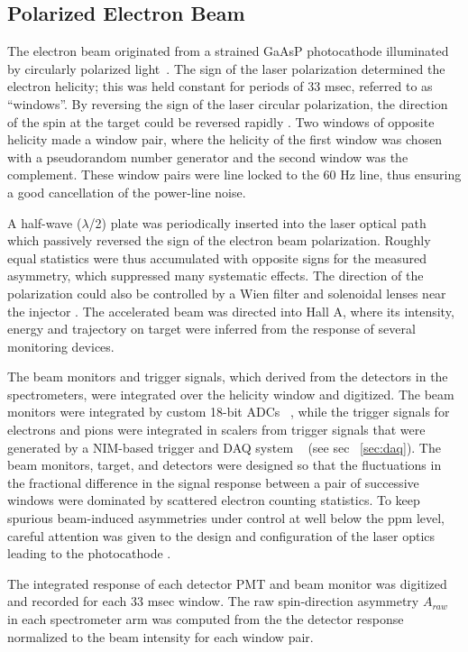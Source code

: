 
\subsection{Polarized Electron Beam}\label{sec:app_electronbeam}

The electron beam originated from a strained GaAsP 
photocathode illuminated by 
circularly polarized light~\cite{Sinclair2007}.
The sign of the laser polarization determined the electron
helicity; this was held constant for periods of 33 msec,
referred to as ``windows''.
By reversing the sign of the laser circular 
polarization, the direction of the spin at the target could be 
reversed rapidly \cite{Paschke:2007zz}.
Two windows of opposite helicity made a window pair, where
the helicity of the first window was chosen with a pseudorandom
number generator and the second window was the complement.
These window pairs were line locked to the 60 Hz line,
thus ensuring a good cancellation of the power-line noise. 
 
A half-wave ($\lambda$/2) plate was periodically inserted into the 
laser optical path which passively reversed the
sign of the electron beam polarization. 
Roughly equal statistics were thus 
accumulated with opposite signs for the measured asymmetry, 
which suppressed many systematic effects.  
The direction of the polarization could also be
controlled by a Wien filter and solenoidal lenses
near the injector \cite{GramesWien2011}.  The accelerated beam was 
directed into Hall A, where its intensity, energy and trajectory on 
target were inferred from the response of several monitoring devices.

The beam monitors and trigger signals, which derived from
the detectors in the spectrometers, 
were integrated over the helicity window
and digitized.  The beam monitors were integrated by
custom 18-bit ADCs ~\cite{ref:prex}, while the
trigger signals for electrons and pions were integrated
in scalers from trigger signals that were generated by a NIM-based
trigger and DAQ system ~\cite{ref:pvdis_nim} (see sec ~\ref{sec:daq}).
The beam monitors, target, and detectors were
designed so that
the fluctuations in the fractional difference in 
the signal response between
a pair of successive windows were
dominated by scattered electron counting statistics.
To keep spurious beam-induced asymmetries under
control at well below the ppm level, 
careful attention was given to the design and configuration of the laser 
optics leading to the photocathode \cite{Paschke:2007zz}.

The integrated response of each detector PMT and beam monitor
was digitized and recorded for each 33 msec window.
The raw spin-direction asymmetry $A_{raw}$
in each spectrometer arm was computed from the the detector response
normalized to the beam intensity 
for each window pair. 

